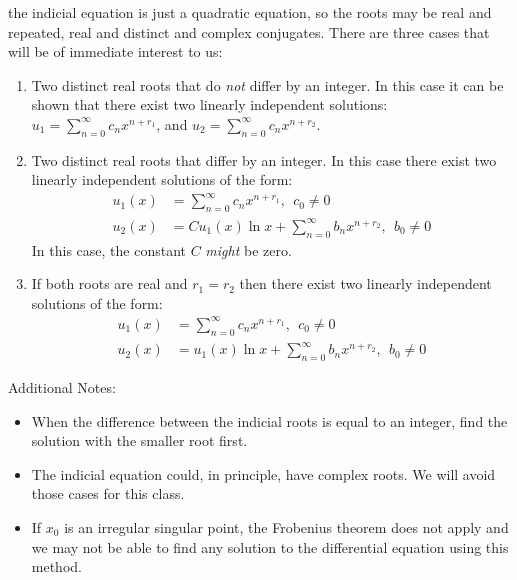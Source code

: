  the indicial equation is just a quadratic equation, so the roots may be real and repeated, real and distinct and complex conjugates.  There are three cases that will be of immediate interest to us:
\begin{enumerate}
\item Two distinct real roots that do \emph{not} differ by an integer.  In this case it can be shown that there exist two linearly independent solutions: $u_1 = \sum_{n=0}^{\infty}c_nx^{n+r_1}$, and $u_2 = \sum_{n=0}^{\infty}c_nx^{n+r_2}$.
\item Two distinct real roots that differ by an integer.  In this case there exist two linearly independent solutions of the form:
\begin{align*}
u_1(x) &= \sum\limits_{n=0}^{\infty}c_nx^{n+r_1}, \ \ c_0 \ne 0 \\
u_2(x) &= C u_1(x) \ln{x} + \sum\limits_{n=0}^{\infty}b_nx^{n+r_2}, \ \ b_0 \ne 0 
\end{align*}
In this case, the constant $C$ \emph{might} be zero.
\item If both roots are real and $r_1 = r_2$ then there exist two linearly independent solutions of the form:
\begin{align*}
u_1(x) &= \sum\limits_{n=0}^{\infty}c_nx^{n+r_1}, \ \ c_0 \ne 0 \\
u_2(x) &= u_1(x) \ln{x} + \sum\limits_{n=0}^{\infty}b_nx^{n+r_2}, \ \ b_0 \ne 0
\end{align*}
\end{enumerate}

\noindent Additional Notes:

\begin{itemize}
\item When the difference between the indicial roots is equal to an integer, find the solution with the smaller root first.

\item The indicial equation could, in principle, have complex roots.  We will avoid those cases for this class.

\item If $x_0$ is an irregular singular point, the Frobenius theorem does not apply and we may not be able to find any solution to the differential equation using this method.
\end{itemize}

